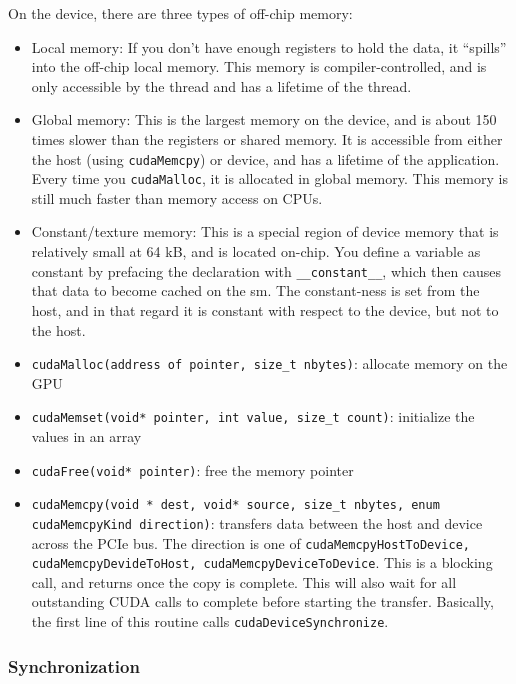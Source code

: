 \documentclass[10pt]{article}
\begin{document}
\begin{flushleft}
On the device, there are three types of off-chip memory:

\begin{itemize}
\item Local memory: If you don't have enough registers to hold the data, it ``spills'' into the off-chip local memory. This memory is compiler-controlled, and is only accessible by the thread and has a lifetime of the thread.
\item Global memory: This is the largest memory on the device, and is about 150 times slower than the registers or shared memory. It is accessible from either the host (using {\tt cudaMemcpy}) or device, and has a lifetime of the application. Every time you {\tt cudaMalloc}, it is allocated in global memory. This memory is still much faster than memory access on CPUs. 
\item Constant/texture memory: This is a special region of device memory that is relatively small at 64 kB, and is located on-chip. You define a variable as constant by prefacing the declaration with {\tt \_\_constant\_\_}, which then causes that data to become cached on the \gls{sm}. The constant-ness is set from the host, and in that regard it is constant with respect to the device, but not to the host. 
\end{itemize}

\begin{itemize}
\item {\tt cudaMalloc(address of pointer, size\_t nbytes)}: allocate memory on the GPU
\item {\tt cudaMemset(void* pointer, int value, size\_t count)}: initialize the values in an array
\item {\tt cudaFree(void* pointer)}: free the memory pointer
\item {\tt cudaMemcpy(void * dest, void* source, size\_t nbytes, enum cudaMemcpyKind direction)}: transfers data between the host and device across the PCIe bus. The direction is one of {\tt cudaMemcpyHostToDevice, cudaMemcpyDevideToHost, cudaMemcpyDeviceToDevice}. This is a blocking call, and returns once the copy is complete. This will also wait for all outstanding CUDA calls to complete before starting the transfer. Basically, the first line of this routine calls {\tt cudaDeviceSynchronize}. 
\end{itemize}

\subsubsection{Synchronization}


\end{flushleft}
\end{document}
